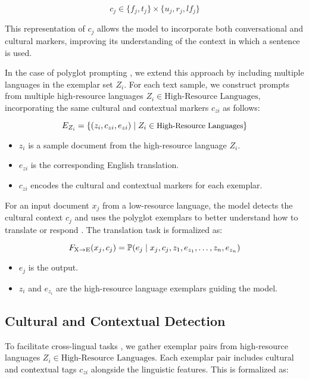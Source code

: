 \[
c_j \in \{f_j, t_j\} \times \{u_j, r_j, lf_j\}
\]

This representation of \(c_j\) allows the model to incorporate both conversational and cultural markers, improving its understanding of the context in which a sentence is used.

In the case of polyglot prompting \cite{Ng:22}, we extend this approach by including multiple languages in the exemplar set \(Z_i\). For each text sample, we construct prompts from multiple high-resource languages \(Z_i \in \text{High-Resource Languages}\), incorporating the same cultural and contextual markers \(c_{zi}\) as follows:

\[
\small
E_{Z_i} = \{(z_i, c_{zi}, e_{zi}) \mid Z_i \in \text{High-Resource Languages}\}
\]

\begin{itemize}
    \item \(z_i\) is a sample document from the high-resource language \(Z_i\).
    \item \(e_{zi}\) is the corresponding English translation.
    \item \(c_{zi}\) encodes the cultural and contextual markers for each exemplar.
\end{itemize}


For an input document \(x_j\) from a low-resource language, the model detects the cultural context \(c_j\) and uses the polyglot exemplars to better understand how to translate or respond \cite{Ng:22}. The translation task is formalized as:

\[
\small
F_{\text{X} \to \text{E}}(x_j, c_j) = \mathbb{P}(e_j \mid x_j, c_j, z_1, e_{z_1}, \dots, z_n, e_{z_n})
\]

\begin{itemize}
    \item \(e_j\) is the output.
    \item \(z_i\) and \(e_{z_i}\) are the high-resource language exemplars guiding the model.
\end{itemize}

\subsection{Cultural and Contextual Detection}

To facilitate cross-lingual tasks \cite{Nguyen:24}, we gather exemplar pairs from high-resource languages \(Z_i \in \text{High-Resource Languages}\). Each exemplar pair includes cultural and contextual tags \(c_{zi}\) alongside the linguistic features. This is formalized as:

